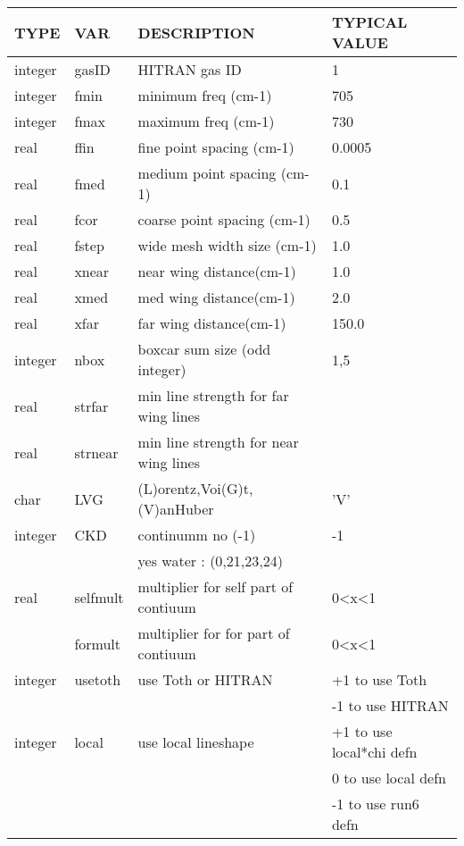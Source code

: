 \documentclass[11pt]{article}
\begin{document}
\begin{longtable}{llll}
\hline
\hline
  TYPE  &   VAR  &         DESCRIPTION  &            TYPICAL VALUE\\
\hline
\hline
integer & gasID  &       HITRAN gas ID      &            1\\
\hline

integer & fmin    &      minimum freq (cm-1) &          705\\
integer & fmax    &      maximum freq (cm-1) &          730\\
\hline

real   &  ffin    &      fine point spacing (cm-1) &    0.0005\\
real   &  fmed    &      medium point spacing (cm-1)&   0.1\\
real   &  fcor    &      coarse point spacing (cm-1)  & 0.5\\
\hline

real   &  fstep   &      wide mesh width size (cm-1) &    1.0\\
real   &  xnear   &      near wing distance(cm-1)    &    1.0\\
real   &  xmed    &      med wing distance(cm-1)     &    2.0\\
real   &  xfar    &      far wing distance(cm-1)     &    150.0\\
\hline

integer & nbox     &     boxcar sum size (odd integer) &  1,5\\
\hline

real   &  strfar   &    min line strength for far wing lines & \\
real   &  strnear  &    min line strength for near wing lines& \\
\hline

char   &  LVG      &      (L)orentz,Voi(G)t,(V)anHuber  &  'V' \\
integer &  CKD     &       continumm no (-1)            &   -1 \\
        &          &       yes water : (0,21,23,24)    & \\
\hline

real    &  selfmult &       multiplier for self part of contiuum &  0<x<1 \\
        &  formult  &       multiplier for for  part of contiuum  & 0<x<1 \\
\hline

integer & usetoth &        use Toth or HITRAN &           +1 to use Toth \\
        &         &                           &          -1 to use HITRAN \\
\hline

integer & local &         use local lineshape   & +1 to use local*chi defn\\
        &       &                                  &  0 to use local defn \\
        &       &                                  & -1 to use run6 defn\\
\hline
\hline
\end{longtable}
\end{document}
